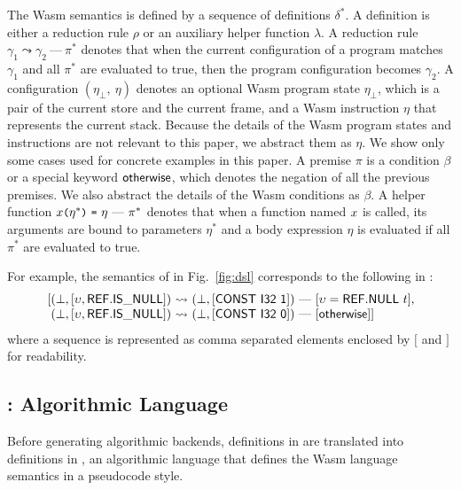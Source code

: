 The Wasm semantics is defined by a sequence of definitions $\delta^*$.
A definition is either a reduction rule $\rho$ or an auxiliary helper function $\lambda$.
A reduction rule $\gamma_1 \leadsto \gamma_2\ \mbox{---}\ \pi^*$ denotes that
when the current configuration of a program matches $\gamma_1$ and
all $\pi^*$ are evaluated to true, then the program configuration becomes $\gamma_2$.
A configuration $(\eta_\bot,\ \eta)$ denotes an optional Wasm program state $\eta_\bot$,
which is a pair of the current store and the current frame,
and a Wasm instruction $\eta$ that represents the current stack.
Because the details of the Wasm program states and instructions are
not relevant to this paper,
we abstract them as $\eta$. We show only some cases used for concrete
examples in this paper.
A premise $\pi$ is a condition $\beta$ or a special keyword
\ensuremath{\mathsf{\small otherwise}},
which denotes the negation of all the previous premises.
We also abstract the details of the Wasm conditions as $\beta$.
A helper function $\varx \kwrl \eta^* \kwrr\ \kwequ\ \eta\ \mbox{---}\ \pi^*$ denotes that
when a function named $x$ is called, its arguments are bound to parameters $\eta^*$
and a body expression $\eta$ is evaluated if all $\pi^*$ are evaluated to true.

For example, the semantics of 
in Fig.~\ref{fig:dsl} corresponds to the following in \dl:
\[
\begin{array}{l@{}l@{~}c@{~}l}
[&(\bot, [\upsilon, \ssf{REF.IS\_NULL}]) &\leadsto& (\bot, [\ssf{CONST\ I32\ 1}])\
\mbox{---}\ [\upsilon = \ssf{REF.NULL}\ t],\\
&(\bot, [\upsilon, \ssf{REF.IS\_NULL}])&\leadsto&(\bot, [\ssf{CONST\ I32\ 0}])\
\mbox{---}\ [\ssf{\small otherwise}] ]
\end{array}
\]
where a sequence is represented as comma separated elements
enclosed by $[$ and $]$ for readability.

\subsection{\al: Algorithmic Language}\label{sec:aldef}
Before generating algorithmic backends, definitions in \dl are translated into definitions in \al,
an algorithmic language that defines the Wasm language semantics in a pseudocode style.

